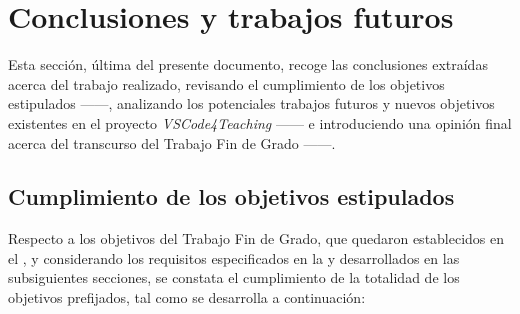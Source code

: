 \chapter{Conclusiones y trabajos futuros}
\label{cap:conclusiones}

Esta sección, última del presente documento, recoge las conclusiones extraídas acerca del trabajo realizado, revisando el cumplimiento de los objetivos estipulados ------, analizando los potenciales trabajos futuros y nuevos objetivos existentes en el proyecto \textit{VSCode4Teaching} ------ e introduciendo una opinión final acerca del transcurso del Trabajo Fin de Grado ------.

\section{Cumplimiento de los objetivos estipulados}
\label{subsec:cumplimientoObjetivos}
Respecto a los objetivos del Trabajo Fin de Grado, que quedaron establecidos en el , y considerando los requisitos especificados en la  y desarrollados en las subsiguientes secciones, se constata el cumplimiento de la totalidad de los objetivos prefijados, tal como se desarrolla a continuación:
